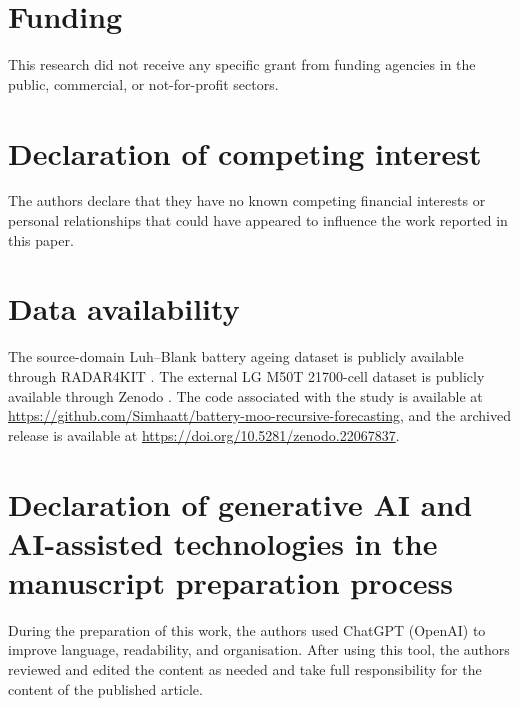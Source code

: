 \documentclass[a4paper,fleqn]{cas-sc}
\begin{document}

\section*{Funding}

This research did not receive any specific grant from funding agencies in the
public, commercial, or not-for-profit sectors.


\section*{Declaration of competing interest}

The authors declare that they have no known competing financial interests or
personal relationships that could have appeared to influence the work reported
in this paper.


\section*{Data availability}

The source-domain Luh--Blank battery ageing dataset is publicly available
through RADAR4KIT \cite{luh2024data}. The external LG M50T 21700-cell dataset
is publicly available through Zenodo \cite{kirkaldy2024data}. The code
associated with the study is available at
\url{https://github.com/Simhaatt/battery-moo-recursive-forecasting}, and the
archived release is available at
\url{https://doi.org/10.5281/zenodo.22067837}.


\section*{Declaration of generative AI and AI-assisted technologies in the manuscript preparation process}

During the preparation of this work, the authors used ChatGPT (OpenAI) to
improve language, readability, and organisation. After using this tool, the
authors reviewed and edited the content as needed and take full responsibility
for the content of the published article.
\end{document}
